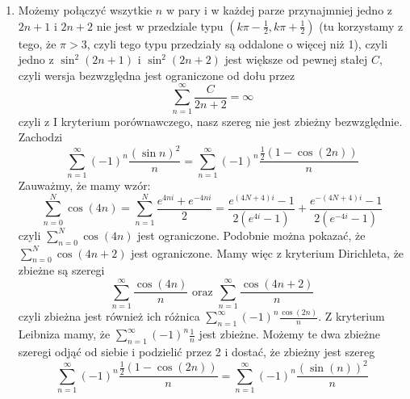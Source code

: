 \documentclass{../note}
\begin{document}
\begin{rozwiazanie}
\begin{enumerate}[label=(\alph*)]
    \[\sum_{m \text{ parzyste}}\sum_{n=m^2}^{(m+1)^2-1} \left(\frac1n - \frac{1}{n + 2m + 1}\right) < \sum_{m =1}^\infty\sum_{n=m^2}^{(m+1)^2-1} \left(\frac1n - \frac{1}{n + 2m + 1}\right) =\]
    \[\sum_{n=1}^{\infty} \left(\frac1n - \frac{1}{n + 2\lfloor\sqrt{n}\rfloor + 1}\right) = \sum_{n=1}^{\infty} \frac{2\lfloor\sqrt{n}\rfloor + 1}{n(n + 2\lfloor\sqrt{n}\rfloor + 1)} < \sum_{n=1}^{\infty} \frac{3\sqrt{n}}{n^2} = 3\sum_{n=1}^{\infty} \frac{1}{n^{\frac32}} < \infty\]
    czyli z I kryterium porównawczego drugi składnik też jest zbieżny, czyli całość jest zbieżna.
    \item Możemy połączyć wszytkie $n$ w pary i w każdej parze przynajmniej jedno z $2n + 1$ i $2n + 2$ nie jest w przedziale typu $\left(k\pi - \frac12, k\pi + \frac12\right)$ (tu korzystamy z tego, że $\pi > 3$, czyli tego typu przedziały są oddalone o więcej niż 1), czyli jedno z $\sin^2(2n + 1)$ i $\sin^2(2n + 2)$ jest większe od pewnej stałej $C$, czyli wersja bezwzględna jest ograniczone od dołu przez
    \[\sum_{n=1}^{\infty} \frac{C}{2n + 2} = \infty\]
    czyli z I kryterium porównawczego, nasz szereg nie jest zbieżny bezwzględnie.\\
    Zachodzi
    \[\sum_{n=1}^{\infty}(-1)^{n}\frac{(\sin n)^{2}}{n} = \sum_{n=1}^{\infty}(-1)^{n}\frac{\frac12(1 - \cos(2n))}{n}\]
    Zauważmy, że mamy wzór:
    \[\sum_{n=0}^{N} \cos(4n) = \sum_{n=1}^{N} \frac{e^{4ni} + e^{-4ni}}{2} = \frac{e^{(4N+4)i} - 1}{2(e^{4i} - 1)} + \frac{e^{-(4N+4)i} - 1}{2(e^{-4i} - 1)}\]
    czyli $\sum_{n=0}^{N} \cos(4n)$ jest ograniczone. Podobnie można pokazać, że $\sum_{n=0}^{N} \cos(4n+2)$ jest ograniczone. Mamy więc z kryterium Dirichleta, że zbieżne są szeregi
    \[\sum_{n=1}^{\infty} \frac{\cos(4n)}{n} \text{ oraz } \sum_{n=1}^{\infty} \frac{\cos(4n+2)}{n}\]
    czyli zbieżna jest również ich różnica $\sum_{n=1}^{\infty} (-1)^n \frac{\cos(2n)}{n}$. Z kryterium Leibniza mamy, że $\sum_{n=1}^{\infty} (-1)^n \frac1{n}$ jest zbieżne. Możemy te dwa zbieżne szeregi odjąć od siebie i podzielić przez 2 i dostać, że zbieżny jest szereg
    \[\sum_{n=1}^{\infty} (-1)^n \frac{\frac12(1-\cos(2n))}{n} = \sum_{n=1}^{\infty} (-1)^n \frac{(\sin(n))^2}{n}\]
\end{enumerate}
\end{rozwiazanie}
\end{document}
